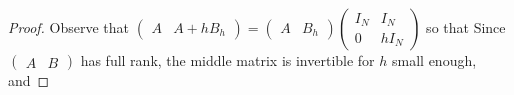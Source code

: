 \begin{proof}
  Observe that $\begin{pmatrix}
    A& A+hB_h
  \end{pmatrix}=\begin{pmatrix}
    A& B_h
  \end{pmatrix}\begin{pmatrix}
    I_N & I_N\\ 0 & hI_N
  \end{pmatrix} $ 
  so that  
  Since $\begin{pmatrix}A & B\end{pmatrix}$
  has full rank, the middle matrix is invertible for $h$ small enough, and 
  

\end{proof}
